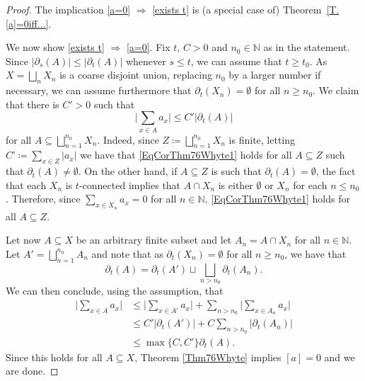 \documentclass[11pt]{amsart}
\newcommand{\N}{\mathbb{N}}
\numberwithin{equation}{section}
\theoremstyle{definition}
\theoremstyle{remark}
\newcommand{\ri}{\partial}
\numberwithin{equation}{section}
\begin{document}
\begin{proof}
The implication \eqref{a=0} $\Rightarrow$ \eqref{exists t} is (a special case of) Theorem~\ref{T.[a]=0iff...}. 

We now show \eqref{exists t} $\Rightarrow$ \eqref{a=0}. Fix $t$, $C>0$ and $n_0\in\N$  as in the statement. Since $|\partial_s(A)|\leq|\partial_t(A)|$ whenever $s\leq t$, we can assume that $t\geq t_0$. As $X=\bigsqcup_nX_n$ is a coarse disjoint union, replacing $n_0$ by a larger number if necessary, we can assume furthermore that $\ri_t(X_n)=\emptyset$ for all $n\geq n_0$. We claim that there is $C'>0$ such that 
\begin{equation}\label{EqCorThm76Whyte1}
\Bigg|\sum_{x\in A}a_x\Bigg|\leq C'|\ri_{t}(A)|
\end{equation}
for all $A\subseteq \bigsqcup_{n=1}^{n_0}X_n$. Indeed, since $Z\coloneqq \bigsqcup_{n=1}^{n_0}X_n$ is finite, letting $C’\coloneqq \sum_{x\in Z} |a_x|$ %
we have that \eqref{EqCorThm76Whyte1} holds for all $A\subseteq Z$ such that $\ri_t(A)\neq\emptyset$. On the other hand, if $A\subseteq Z$ is such that $\ri_t(A)=\emptyset$, the fact that each $X_n$ is $t$-connected implies that $A\cap X_n$ is either $\emptyset$ or $X_n$ for each $n\leq n_0$. Therefore, since $\sum_{x\in X_n}a_x=0$ for all $n\in\N$, \eqref{EqCorThm76Whyte1} holds for all $A\subseteq Z$.
 
Let now $A\subseteq X$ be an arbitrary finite subset and let $A_n=A\cap X_n$ for all $n\in\N$. Let $A'=\bigsqcup_{n=1}^{n_0}A_n$ and note that as $\ri_t(X_n)=\emptyset$ for all $n\geq n_0$, we have that
 \[
 \ri_t(A)=\ri_t(A')\sqcup\bigsqcup_{n>n_0}\ri_t(A_n).
 \] 
 We can then conclude, using the assumption, that 
\begin{align*}
\Bigg|\sum_{x\in A}a_x\Bigg|& \leq \Bigg|\sum_{x\in A'}a_x\Bigg|+\sum_{n>n_0}\Bigg|\sum_{x\in A_n}a_x\Bigg|\\
&\leq C'|\ri_t(A')|+C\sum_{n>n_0}|\ri_t(A_n)|\\
&\leq \max\{C,C'\}\ri_t(A).
 \end{align*}
 Since this holds for all $A\subseteq X$, Theorem \ref{Thm76Whyte} implies $[a]=0$ and we are done.
\end{proof}
\end{document}
